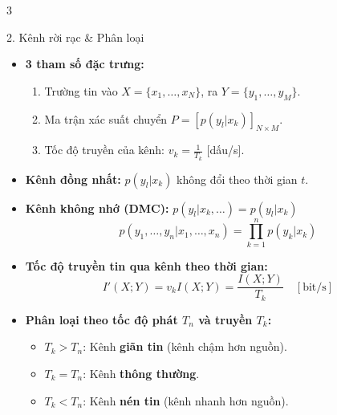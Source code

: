 \documentclass[10pt,landscape,a4paper]{article}
\begin{document}
\begin{multicols*}{3}
\begin{cheatbox}{2. Kênh rời rạc \& Phân loại}
\begin{itemize}[leftmargin=*,noitemsep]
    \item \textbf{3 tham số đặc trưng:}
    \begin{enumerate}[leftmargin=*,noitemsep]
        \item Trường tin vào $X = \{x_1,\dots,x_N\}$, ra $Y = \{y_1,\dots,y_M\}$.
        \item Ma trận xác suất chuyển $P = [p(y_l|x_k)]_{N \times M}$.
        \item Tốc độ truyền của kênh: $v_k = \frac{1}{T_k}$ [dấu/s].
    \end{enumerate}
    \item \textbf{Kênh đồng nhất:} $p(y_l|x_k)$ không đổi theo thời gian $t$.
    \item \textbf{Kênh không nhớ (DMC):} $p(y_l|x_k,\dots) = p(y_l|x_k)$
    \[ p(y_1,\dots,y_n|x_1,\dots,x_n) = \prod_{k=1}^n p(y_k|x_k) \]
    \item \textbf{Tốc độ truyền tin qua kênh theo thời gian:}
    \[ I'(X; Y) = v_k I(X; Y) = \frac{I(X; Y)}{T_k} \quad [\text{bit/s}] \]
    \item \textbf{Phân loại theo tốc độ phát $T_n$ và truyền $T_k$:}
    \begin{itemize}[leftmargin=*,noitemsep]
        \item $T_k > T_n$: Kênh \textbf{giãn tin} (kênh chậm hơn nguồn).
        \item $T_k = T_n$: Kênh \textbf{thông thường}.
        \item $T_k < T_n$: Kênh \textbf{nén tin} (kênh nhanh hơn nguồn).
    \end{itemize}
\end{itemize}
\end{cheatbox}


\end{multicols*}
\end{document}
